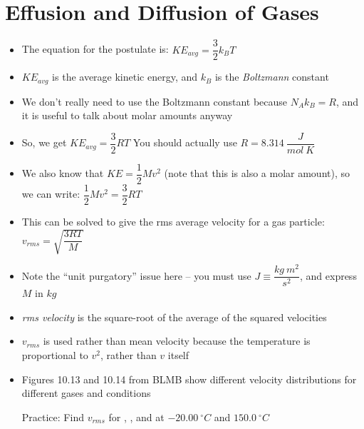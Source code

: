 \documentclass[12pt, openany, letterpaper]{memoir}
\begin{document}
\section{Effusion and Diffusion of Gases}
\begin{itemize}
  \item The equation for the  postulate is: $KE_{avg}=\dfrac{3}{2}k_BT$
  \item $KE_{avg}$ is the average kinetic energy, and $k_B$ is the \emph{Boltzmann} constant
  \item We don't really need to use the Boltzmann constant because $N_Ak_B=R$, and it is useful to talk about molar amounts anyway
  \item So, we get $KE_{avg}=\dfrac{3}{2}RT$ \hspace{2em}  You should actually use $R=8.314~\dfrac{J}{mol~K}$
  \item We also know that $KE=\dfrac{1}{2}Mv^2$ (note that this is also a molar amount), so we can write: $\dfrac{1}{2}Mv^2 = \dfrac{3}{2}RT$
  \item This can be solved to give the rms average velocity for a gas particle: $v_{rms}=\sqrt{\dfrac{3RT}{M}}$
  \item Note the ``unit purgatory'' issue here -- you must use $J\equiv\dfrac{kg~m^2}{s^2}$, and express $M$ in $kg$
  \item \emph{rms velocity} is the square-root of the average of the squared velocities
  \item $v_{rms}$ is used rather than mean velocity because the temperature is proportional to $v^2$, rather than $v$ itself
  \item Figures 10.13 and 10.14 from BLMB show different velocity distributions for different gases and conditions

        Practice: Find $v_{rms}$ for , , and  at $-20.00~^\circ C$ and $150.0~^\circ C$


\end{itemize}
\end{document}
